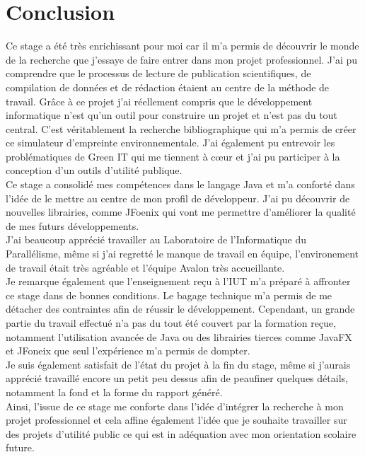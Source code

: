 \newpage
\section*{Conclusion}
Ce stage a été très enrichissant pour moi car il m'a permis de découvrir le monde de la recherche que j'essaye de faire entrer dans mon projet professionnel. J'ai pu comprendre que le processus de lecture de publication scientifiques, de compilation de données et de rédaction étaient au centre de la méthode de travail. Grâce à ce projet j'ai réellement compris que le développement informatique n'est qu'un outil pour construire un projet et n'est pas du tout central. C'est véritablement la recherche bibliographique qui m'a permis de créer ce simulateur d'empreinte environnementale. J'ai également pu entrevoir les problématiques de Green IT qui me tiennent à cœur et j'ai pu participer à la conception d'un outils d'utilité publique.\\

Ce stage a consolidé mes compétences dans le langage Java et m'a conforté dans l'idée de le mettre au centre de mon profil de développeur. J'ai pu découvrir de nouvelles librairies, comme JFoenix qui vont me permettre d'améliorer la qualité de mes futurs développements.\\

J'ai beaucoup apprécié travailler au Laboratoire de l'Informatique du Parallélisme, même si j'ai regretté le manque de travail en équipe, l'environement de travail était très agréable et l'équipe Avalon très accueillante.\\

Je remarque également que l'enseignement reçu à l'IUT m'a préparé à affronter ce stage dans de bonnes conditions. Le bagage technique m'a permis de me détacher des contraintes afin de réussir le développement. Cependant, un grande partie du travail effectué n'a pas du tout été couvert par la formation reçue, notamment l'utilisation avancée de Java ou des librairies tierces comme JavaFX et JFoneix que seul l'expérience m'a permis de dompter.\\

Je suis également satisfait de l'état du projet à la fin du stage, même si j'aurais apprécié travaillé encore un petit peu dessus afin de peaufiner quelques détails, notamment la fond et la forme du rapport généré.\\

Ainsi, l'issue de ce stage me conforte dans l'idée d'intégrer la recherche à mon projet professionnel et cela affine également l'idée que je souhaite travailler sur des projets d'utilité public ce qui est in adéquation avec mon orientation scolaire future.